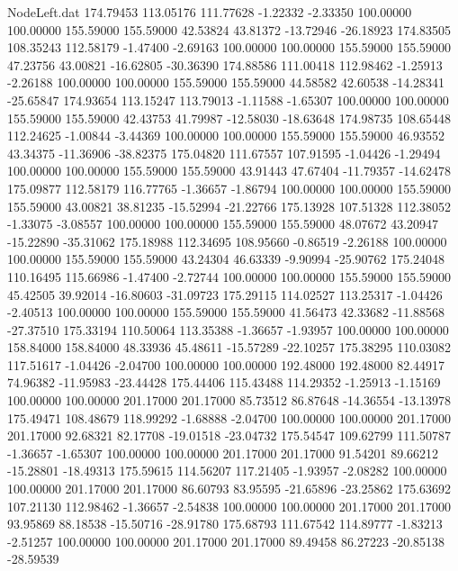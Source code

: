 \begin{filecontents}{NodeLeft.dat}
 174.79453  113.05176  111.77628    -1.22332   -2.33350  100.00000  100.00000  155.59000  155.59000   42.53824   43.81372  -13.72946  -26.18923
 174.83505  108.35243  112.58179    -1.47400   -2.69163  100.00000  100.00000  155.59000  155.59000   47.23756   43.00821  -16.62805  -30.36390
 174.88586  111.00418  112.98462    -1.25913   -2.26188  100.00000  100.00000  155.59000  155.59000   44.58582   42.60538  -14.28341  -25.65847
 174.93654  113.15247  113.79013    -1.11588   -1.65307  100.00000  100.00000  155.59000  155.59000   42.43753   41.79987  -12.58030  -18.63648
 174.98735  108.65448  112.24625    -1.00844   -3.44369  100.00000  100.00000  155.59000  155.59000   46.93552   43.34375  -11.36906  -38.82375
 175.04820  111.67557  107.91595    -1.04426   -1.29494  100.00000  100.00000  155.59000  155.59000   43.91443   47.67404  -11.79357  -14.62478
 175.09877  112.58179  116.77765    -1.36657   -1.86794  100.00000  100.00000  155.59000  155.59000   43.00821   38.81235  -15.52994  -21.22766
 175.13928  107.51328  112.38052    -1.33075   -3.08557  100.00000  100.00000  155.59000  155.59000   48.07672   43.20947  -15.22890  -35.31062
 175.18988  112.34695  108.95660    -0.86519   -2.26188  100.00000  100.00000  155.59000  155.59000   43.24304   46.63339   -9.90994  -25.90762
 175.24048  110.16495  115.66986    -1.47400   -2.72744  100.00000  100.00000  155.59000  155.59000   45.42505   39.92014  -16.80603  -31.09723
 175.29115  114.02527  113.25317    -1.04426   -2.40513  100.00000  100.00000  155.59000  155.59000   41.56473   42.33682  -11.88568  -27.37510
 175.33194  110.50064  113.35388    -1.36657   -1.93957  100.00000  100.00000  158.84000  158.84000   48.33936   45.48611  -15.57289  -22.10257
 175.38295  110.03082  117.51617    -1.04426   -2.04700  100.00000  100.00000  192.48000  192.48000   82.44917   74.96382  -11.95983  -23.44428
 175.44406  115.43488  114.29352    -1.25913   -1.15169  100.00000  100.00000  201.17000  201.17000   85.73512   86.87648  -14.36554  -13.13978
 175.49471  108.48679  118.99292    -1.68888   -2.04700  100.00000  100.00000  201.17000  201.17000   92.68321   82.17708  -19.01518  -23.04732
 175.54547  109.62799  111.50787    -1.36657   -1.65307  100.00000  100.00000  201.17000  201.17000   91.54201   89.66212  -15.28801  -18.49313
 175.59615  114.56207  117.21405    -1.93957   -2.08282  100.00000  100.00000  201.17000  201.17000   86.60793   83.95595  -21.65896  -23.25862
 175.63692  107.21130  112.98462    -1.36657   -2.54838  100.00000  100.00000  201.17000  201.17000   93.95869   88.18538  -15.50716  -28.91780
 175.68793  111.67542  114.89777    -1.83213   -2.51257  100.00000  100.00000  201.17000  201.17000   89.49458   86.27223  -20.85138  -28.59539

\end{filecontents}
